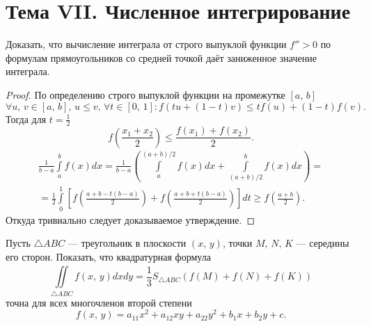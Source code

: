 \documentclass[a4paper]{article}
\begin{document}
\section*{Тема VII. Численное интегрирование}
\begin{hiProb}[6.1]
Доказать, что вычисление интеграла от строго выпуклой функции
$f''>0$ по формулам прямоугольников со средней точкой даёт
заниженное значение интеграла.
\end{hiProb}
\begin{proof}
По определению строго выпуклой функции на
промежутке $[a,\,b]$
\[
	\forall u,\,v \in [a,\,b],\, u\le v,\, \forall t \in [0,\,1]:
	f(tu+(1-t)v)\le  t f(u)+(1-t)f(v)
.\] 
Тогда для $t=\frac{1}{2}$ 
\[
	f\left( \frac{x_1+x_2}{2} \right) \le \frac{f(x_1)+f(x_2)}{2}
.\] 
\begin{multline*}
	\frac{1}{b-a} \int\limits_{a}^{b} f(x) dx=
	\frac{1}{b-a} \left( \int\limits_{a}^{(a+b) /2} f(x)dx +\int\limits_{(a+b) /2}^{b} f(x) dx   \right) =\\=
	\frac{1}{2} \int\limits_{0}^{1} \left[ 
	f\left( \frac{a+b-t(b-a)}{2} \right) +
f\left( \frac{a+b+t(b-a)}{2} \right) \right] dt \ge f
\left( \frac{a+b}{2} \right) 
.\end{multline*} 
Откуда тривиально следует доказываемое утверждение.
\end{proof}
\begin{hiProb}[8.3]
	Пусть $\triangle ABC$ --- треугольник в плоскости $(x,\,y)$, точки $M,\,N,\,K$ --- середины его сторон. Показать, что
	квадратурная формула
\[
	\iint\limits_{\triangle ABC}^{}  f(x,\,y) dxdy=\frac{1}{3}
	S_{\triangle ABC} \left( f(M)+f(N)+f(K) \right) 
\]
точна для всех многочленов второй степени
\[
	f(x,\,y)=a_{11}x^2 +a_{12}xy +a_{22}y^2 +b_1x+b_2y+c
.\] 
\end{hiProb}
\end{document}
